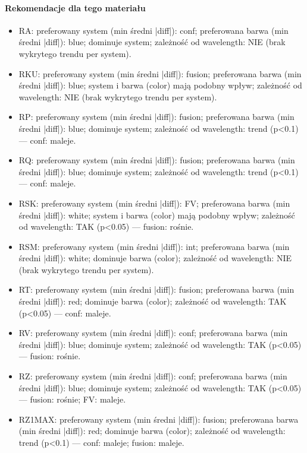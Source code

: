 \documentclass[
  10pt,
]{article}
\begin{document}
\paragraph{Rekomendacje dla tego materiału}
\begin{itemize}
\item RA: preferowany system (min średni |diff|): conf; preferowana barwa (min średni |diff|): blue; dominuje system; zależność od wavelength: NIE (brak wykrytego trendu per system).
\item RKU: preferowany system (min średni |diff|): fusion; preferowana barwa (min średni |diff|): blue; system i barwa (color) mają podobny wpływ; zależność od wavelength: NIE (brak wykrytego trendu per system).
\item RP: preferowany system (min średni |diff|): fusion; preferowana barwa (min średni |diff|): blue; dominuje system; zależność od wavelength: trend (p<0.1) — conf: maleje.
\item RQ: preferowany system (min średni |diff|): fusion; preferowana barwa (min średni |diff|): blue; dominuje system; zależność od wavelength: trend (p<0.1) — conf: maleje.
\item RSK: preferowany system (min średni |diff|): FV; preferowana barwa (min średni |diff|): white; system i barwa (color) mają podobny wpływ; zależność od wavelength: TAK (p<0.05) — fusion: rośnie.
\item RSM: preferowany system (min średni |diff|): int; preferowana barwa (min średni |diff|): white; dominuje barwa (color); zależność od wavelength: NIE (brak wykrytego trendu per system).
\item RT: preferowany system (min średni |diff|): fusion; preferowana barwa (min średni |diff|): red; dominuje barwa (color); zależność od wavelength: TAK (p<0.05) — conf: maleje.
\item RV: preferowany system (min średni |diff|): conf; preferowana barwa (min średni |diff|): blue; dominuje system; zależność od wavelength: TAK (p<0.05) — fusion: rośnie.
\item RZ: preferowany system (min średni |diff|): conf; preferowana barwa (min średni |diff|): blue; dominuje system; zależność od wavelength: TAK (p<0.05) — fusion: rośnie; FV: maleje.
\item RZ1MAX: preferowany system (min średni |diff|): fusion; preferowana barwa (min średni |diff|): red; dominuje barwa (color); zależność od wavelength: trend (p<0.1) — conf: maleje; fusion: maleje.
\end{itemize}
\end{document}
